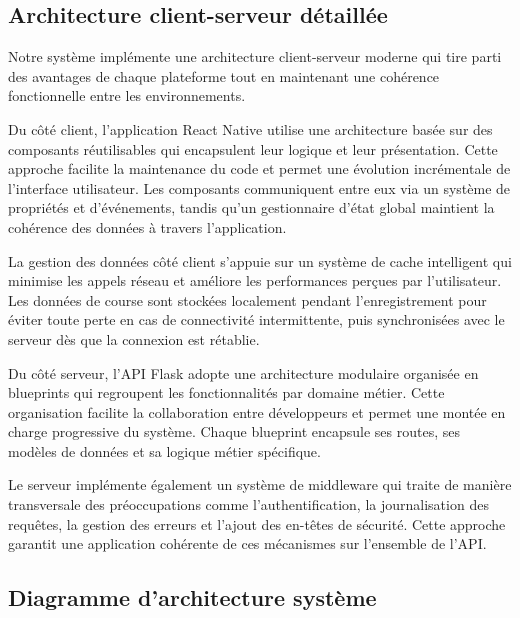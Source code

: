 \subsection{Architecture client-serveur détaillée}

Notre système implémente une architecture client-serveur moderne qui tire parti des avantages de chaque plateforme tout en maintenant une cohérence fonctionnelle entre les environnements.

Du côté client, l'application React Native utilise une architecture basée sur des composants réutilisables qui encapsulent leur logique et leur présentation. Cette approche facilite la maintenance du code et permet une évolution incrémentale de l'interface utilisateur. Les composants communiquent entre eux via un système de propriétés et d'événements, tandis qu'un gestionnaire d'état global maintient la cohérence des données à travers l'application.

La gestion des données côté client s'appuie sur un système de cache intelligent qui minimise les appels réseau et améliore les performances perçues par l'utilisateur. Les données de course sont stockées localement pendant l'enregistrement pour éviter toute perte en cas de connectivité intermittente, puis synchronisées avec le serveur dès que la connexion est rétablie.

Du côté serveur, l'API Flask adopte une architecture modulaire organisée en blueprints qui regroupent les fonctionnalités par domaine métier. Cette organisation facilite la collaboration entre développeurs et permet une montée en charge progressive du système. Chaque blueprint encapsule ses routes, ses modèles de données et sa logique métier spécifique.

Le serveur implémente également un système de middleware qui traite de manière transversale des préoccupations comme l'authentification, la journalisation des requêtes, la gestion des erreurs et l'ajout des en-têtes de sécurité. Cette approche garantit une application cohérente de ces mécanismes sur l'ensemble de l'API.

\subsection{Diagramme d'architecture système}

